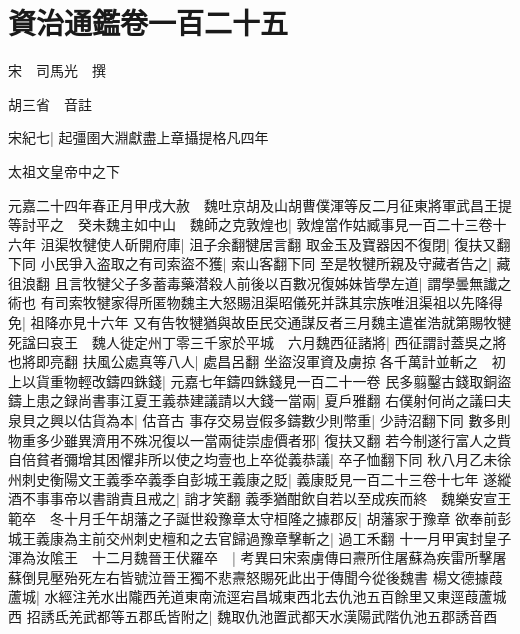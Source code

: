 \chapter{資治通鑑卷一百二十五}
宋　司馬光　撰

胡三省　音註

宋紀七|{
	起彊圉大淵獻盡上章攝提格凡四年}


太祖文皇帝中之下

元嘉二十四年春正月甲戌大赦　魏吐京胡及山胡曹僕渾等反二月征東將軍武昌王提等討平之　癸未魏主如中山　魏師之克敦煌也|{
	敦煌當作姑臧事見一百二十三卷十六年}
沮渠牧犍使人斫開府庫|{
	沮子余翻犍居言翻}
取金玉及寶器因不復閉|{
	復扶又翻下同}
小民爭入盗取之有司索盜不獲|{
	索山客翻下同}
至是牧犍所親及守藏者告之|{
	藏徂浪翻}
且言牧犍父子多蓄毒藥潜殺人前後以百數况復姊妹皆學左道|{
	謂學曇無䜟之術也}
有司索牧犍家得所匿物魏主大怒賜沮渠昭儀死并誅其宗族唯沮渠祖以先降得免|{
	祖降亦見十六年}
又有告牧犍猶與故臣民交通謀反者三月魏主遣崔浩就第賜牧犍死諡曰哀王　魏人徙定州丁零三千家於平城　六月魏西征諸將|{
	西征謂討蓋吳之將也將即亮翻}
扶風公處真等八人|{
	處昌呂翻}
坐盜沒軍資及虜掠各千萬計並斬之　初上以貨重物輕改鑄四銖錢|{
	元嘉七年鑄四銖錢見一百二十一卷}
民多翦鑿古錢取銅盜鑄上患之録尚書事江夏王義恭建議請以大錢一當兩|{
	夏戶雅翻}
右僕射何尚之議曰夫泉貝之興以估貨為本|{
	估音古}
事存交易豈假多鑄數少則幣重|{
	少詩沼翻下同}
數多則物重多少雖異濟用不殊况復以一當兩徒崇虛價者邪|{
	復扶又翻}
若今制遂行富人之貲自倍貧者彌增其困懼非所以使之均壹也上卒從義恭議|{
	卒子恤翻下同}
秋八月乙未徐州刺史衡陽文王義季卒義季自彭城王義康之貶|{
	義康貶見一百二十三卷十七年}
遂縱酒不事事帝以書誚責且戒之|{
	誚才笑翻}
義季猶酣飲自若以至成疾而終　魏樂安宣王範卒　冬十月壬午胡藩之子誕世殺豫章太守桓隆之據郡反|{
	胡藩家于豫章}
欲奉前彭城王義康為主前交州刺史檀和之去官歸過豫章擊斬之|{
	過工禾翻}
十一月甲寅封皇子渾為汝隂王　十二月魏晉王伏羅卒　|{
	考異曰宋索虜傳曰燾所住屠蘇為疾雷所擊屠蘇倒見壓殆死左右皆號泣晉王獨不悲燾怒賜死此出于傳聞今從後魏書}
楊文德據葭蘆城|{
	水經注羌水出隴西羌道東南流逕宕昌城東西北去仇池五百餘里又東逕葭蘆城西}
招誘氐羌武都等五郡氐皆附之|{
	魏取仇池置武都天水漢陽武階仇池五郡誘音酉}


